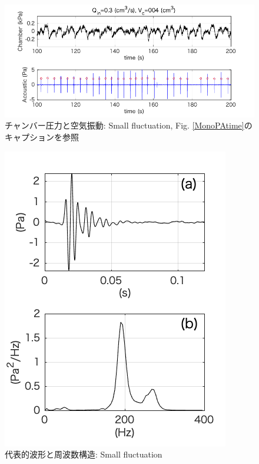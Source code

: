 \documentclass[12pt]{article}
\begin{document}
\begin{figure}[H]
\begin{center}
\includegraphics[scale=1] {FlctPAtime.png} 
\caption[チャンバー圧力と空気振動: Small fluctuation]
{チャンバー圧力と空気振動: Small fluctuation, Fig. \ref{MonoPAtime}のキャプションを参照}
\label{FlctPAtime}
\end{center}
\end{figure} 

\begin{figure}[H]
\begin{center}
\includegraphics[scale=1] {Flctwaveform.png} 
\caption[代表的波形と周波数構造: Small fluctuation]
{代表的波形と周波数構造: Small fluctuation}
\label{Flctwaveform}
\end{center}
\end{figure} 
\end{document}
